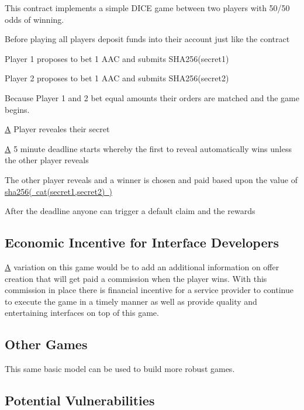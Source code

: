 This contract implements a simple D\+I\+CE game between two players with 50/50 odds of winning.

Before playing all players deposit funds into their  account just like the  contract


\begin{DoxyEnumerate}
\item Player 1 proposes to bet 1 A\+AC and submits S\+H\+A256(secret1)
\item Player 2 proposes to bet 1 A\+AC and submits S\+H\+A256(secret2)
\end{DoxyEnumerate}

Because Player 1 and 2 bet equal amounts their orders are matched and the game begins.


\begin{DoxyEnumerate}
\item \mbox{\hyperlink{struct_a}{A}} Player reveales their secret
\item \mbox{\hyperlink{struct_a}{A}} 5 minute deadline starts whereby the first to reveal automatically wins unless the other player reveals
\item The other player reveals and a winner is chosen and paid based upon the value of \mbox{\hyperlink{structsha256}{sha256( cat(secret1,secret2) )}}
\item After the deadline anyone can trigger a default claim and the rewards
\end{DoxyEnumerate}

\subsection*{Economic Incentive for Interface Developers }

\mbox{\hyperlink{struct_a}{A}} variation on this game would be to add an additional information on offer creation that will get paid a commission when the player wins. With this commission in place there is financial incentive for a service provider to continue to execute the game in a timely manner as well as provide quality and entertaining interfaces on top of this game.

\subsection*{Other Games }

This same basic model can be used to build more robust games.

\subsection*{Potential Vulnerabilities }


